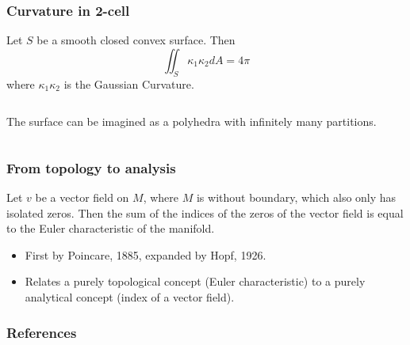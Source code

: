 \documentclass{beamer}
\begin{document}
\begin{frame}
	\frametitle{Curvature in 2-cell}
	\begin{theorem}
		Let $S$ be a smooth closed convex surface. Then
		\[
			\iint_S \kappa_1 \kappa_2 dA = 4 \pi
		\]
		where $\kappa_1 \kappa_2$ is the Gaussian Curvature.
	\end{theorem}
	\begin{columns}
    	\pause
    	    The surface can be imagined as a polyhedra with infinitely many partitions.
		\pause
    \end{columns}
\end{frame}

\begin{frame}
    \frametitle{From topology to analysis}
    \begin{theorem}
        Let $v$ be a vector field on $M$, where $M$ is without boundary, which also only has isolated zeros. Then the sum of the indices of the zeros of the vector field is equal to the Euler characteristic of the manifold.
    \end{theorem}
    \begin{itemize}
        \item First by Poincare, 1885, expanded by Hopf, 1926.
        \item Relates a purely topological concept (Euler characteristic) to a purely analytical concept (index of a vector field).\cite{dummit}
    \end{itemize}
\end{frame}

\begin{frame}
	\frametitle{References}
	
	
\end{frame}
\end{document}

